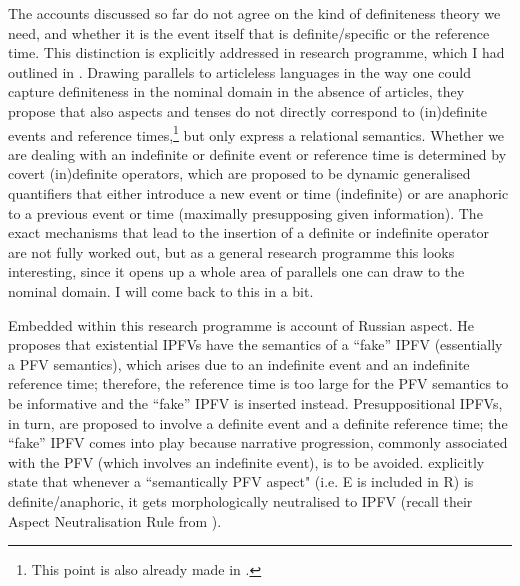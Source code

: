 \documentclass[output=paper,colorlinks,citecolor=brown]{langscibook}
\begin{document}
The accounts discussed so far do not agree on the kind of definiteness theory we need, and whether it is the event itself that is definite/specific or the reference time. This distinction is explicitly addressed in  research programme, which I had outlined in . Drawing parallels to articleless languages in the way one could capture definiteness in the nominal domain in the absence of articles, they propose that also aspects and tenses do not directly correspond to (in)definite events and reference times,\footnote{This point is also already made in \citet{Klein1995}.} but only express a relational semantics. Whether we are dealing with an indefinite or definite event or reference time is determined by covert (in)definite operators, which are proposed to be dynamic generalised quantifiers that either introduce a new event or time (indefinite) or are anaphoric to a previous event or time (maximally presupposing given information). The exact mechanisms that lead to the insertion of a definite or indefinite operator are not fully worked out, but as a general research programme this looks interesting, since it opens up a whole area of parallels one can draw to the nominal domain. I will come back to this in a bit.

Embedded within this research programme is  account of Russian aspect. He proposes that existential IPFVs have the semantics of a ``fake'' IPFV (essentially a PFV semantics), which arises due to an indefinite event and an indefinite reference time; therefore, the reference time is too large for the PFV semantics to be informative and the ``fake'' IPFV is inserted instead. Presuppositional IPFVs, in turn, are proposed to involve a definite event and a definite reference time; the ``fake'' IPFV comes into play because narrative progression, commonly associated with the PFV (which involves an indefinite event), is to be avoided. \citet{gronnstechow16} explicitly state that whenever a ``semantically PFV aspect" (i.e. E is included in R) is definite/anaphoric, it gets morphologically neutralised to IPFV (recall their Aspect Neutralisation Rule from ). 
\end{document}
